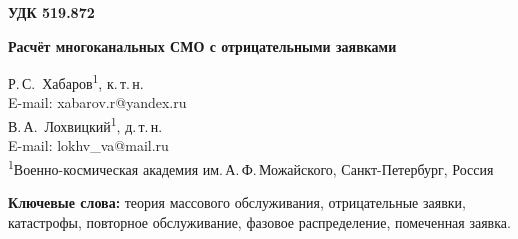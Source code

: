 \documentclass[a4paper,12pt]{article}
\begin{document}
\noindent\textbf{УДК 519.872}
\vspace{1em}

\begin{center}
{\Large\bfseries Расчёт многоканальных СМО с отрицательными заявками}
\end{center}
\vspace{0.8em}

\begin{center}
Р.\,С.~Хабаров\textsuperscript{1}, к.\,т.\,н.\\[2pt]
E-mail: xabarov.r@yandex.ru\\[6pt]
В.\,А.~Лохвицкий\textsuperscript{1}, д.\,т.\,н.\\[2pt]
E-mail: lokhv\_va@mail.ru\\[8pt]
{\small\textsuperscript{1}Военно-космическая академия им.\,А.\,Ф.\,Можайского, Санкт-Петербург, Россия}
\end{center}
\vspace{0.5em}

\begin{abstract}
Рассматриваются многоканальные системы массового обслуживания с пуассоновскими поступлениями и отрицательными воздействиями. Воздействие выбирает один занятый канал либо одновременно затрагивает всю систему. Исследуются удаление заявок и повторное обслуживание с новой или с первоначально выбранной длительностью. Для фазового обслуживания описано совместное состояние каналов и построены уравнения моментов ожидания и пребывания помеченной заявки. Время пребывания при выборочных воздействиях рассчитывается с учётом изменения числа занятых каналов. Для сохранённой работы используется конечная аппроксимация процесса с непрерывными координатами; зависимость каналов при общих прерываниях сохраняется. Отдельно проверяются фазовая аппроксимация, усечение пространства состояний, экстраполяция и статистическая неопределённость имитации. Приведены результаты для нескольких нагрузок, интенсивностей воздействий и числа каналов.
\end{abstract}
\textbf{Ключевые слова:} теория массового обслуживания, отрицательные заявки, катастрофы, повторное обслуживание, фазовое распределение, помеченная заявка.
\end{document}

